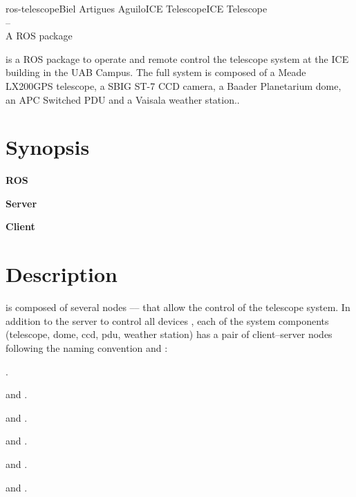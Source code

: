 \documentclass[a4paper,english]{article}
\begin{document}
\begin{Name}{1}{ros-telescope}{Biel Artigues Aguilo}{ICE Telescope}{ICE Telescope\\--\\ A ROS package}

   is a ROS package to operate and remote control the telescope system at the ICE building in the UAB Campus. The full system is composed of a Meade LX200GPS telescope, a SBIG ST-7 CCD camera, a Baader Planetarium dome, an APC Switched PDU and a Vaisala weather station.. 
  \end{Name}

\section{Synopsis}

\textbf{ROS}


\noindent
\textbf{Server}

  

\noindent
\textbf{Client}

     

\section{Description}
 is composed of several nodes ---- that allow the control of the telescope system. In addition to the server to control all devices , each of the system components (telescope, dome, ccd, pdu, weather station) has a pair of client--server nodes following the naming convention  and : 
\begin{Description}\setlength{\itemsep}{0cm}
\item[\Opt{Full-Server}] .
\item[\Opt{Telescope}]  and .
\item[\Opt{CCD}]  and .
\item[\Opt{Dome}]  and .
\item[\Opt{PDU}]  and .
\item[\Opt{WS}]	 and .
\end{Description}
\end{document}
